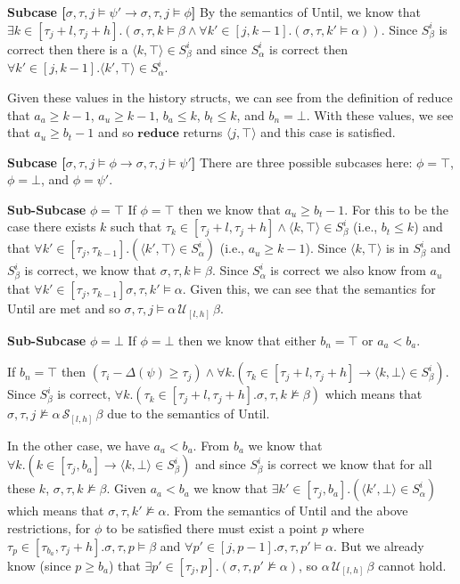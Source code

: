 \documentclass[10pt,a4paper]{article}
\newcommand{\rp}[2]{\ensuremath{\langle #1, #2 \rangle}}
\begin{document}
\textbf{Subcase [$\sigma, \tau, j \vDash \psi' \rightarrow \sigma, \tau, j \vDash \phi$]} 
By the semantics of Until, we know that $\exists k \in [\tau_j+l,\tau_j+h].(\sigma, \tau, k \vDash \beta \wedge \forall k' \in [j,k-1].(\sigma, \tau, k' \vDash \alpha))$. Since $S^i_{\beta}$ is correct then there is a $\rp{k}{\top} \in S^i_{\beta}$ and since $S^i_\alpha$ is correct then $\forall k' \in [j,k-1]. \rp{k'}{\top} \in S^i_\alpha$.

Given these values in the history structs, we can see from the definition of reduce that $a_a \geq k-1$, $a_u \geq k-1$, $b_a \leq k$, $b_t \leq k$, and $b_n = \bot$. With these values, we see that $a_u \geq b_t - 1$ and so $\mathbf{reduce}$ returns $\rp{j}{\top}$ and this case is satisfied.

\textbf{Subcase [$\sigma, \tau, j \vDash \phi \rightarrow \sigma, \tau, j \vDash \psi'$]}
There are three possible subcases here: $\phi = \top$, $\phi = \bot$, and $\phi = \psi'$.

\hspace{2em} \textbf{Sub-Subcase} $\phi = \top$
If $\phi = \top$ then we know that $a_u \geq b_t - 1$. For this to be the case there exists $k$ such that $\tau_k \in [\tau_j+l,\tau_j+h] \wedge \rp{k}{\top} \in S^i_\beta$ (i.e., $b_t \leq k$) and that $\forall k' \in [\tau_j,\tau_{k-1}].(\rp{k'}{\top} \in S^i_\alpha)$ (i.e., $a_u \geq k-1$). Since $\rp{k}{\top}$ is in $S^i_\beta$ and $S^i_\beta$ is correct, we know that $\sigma,\tau,k \vDash \beta$. Since $S^i_\alpha$ is correct we also know from $a_u$ that $\forall k' \in [\tau_j,\tau_{k-1}] \sigma, \tau, k' \vDash \alpha$. Given this, we can see that the semantics for Until are met and so $\sigma, \tau, j \vDash \alpha\, \mathcal{U}_{[l,h]}\, \beta$.

\hspace{2em} \textbf{Sub-Subcase} $\phi = \bot$
If $\phi = \bot$ then we know that either $b_n = \top$ or $a_a < b_a$. 

If $b_n = \top$ then $(\tau_i-\Delta(\psi) \geq \tau_j) \wedge \forall k.(\tau_k \in [\tau_j+l,\tau_j+h] \rightarrow \rp{k}{\bot} \in S^i_\beta)$. Since $S^i_\beta$ is correct, $\forall k.(\tau_k \in [\tau_j+l,\tau_j+h]. \sigma, \tau, k \nvDash \beta)$ which means that $\sigma, \tau, j \nvDash \alpha\, \mathcal{S}_{[l,h]}\, \beta$ due to the semantics of Until.

In the other case, we have $a_a < b_a$. From $b_a$ we know that $\forall k.(k \in [\tau_j,b_a] \rightarrow \rp{k}{\bot} \in S^i_\beta)$ and since $S^i_\beta$ is correct we know that for all these $k$, $\sigma,\tau,k \nvDash \beta$. 
Given $a_a < b_a$ we know that $\exists k' \in [\tau_j,b_a].(\rp{k'}{\bot} \in S^i_\alpha)$ which means that $\sigma, \tau, k' \nvDash \alpha$. 
From the semantics of Until and the above restrictions, for $\phi$ to be satisfied there must exist a point $p$ where $\tau_p \in [\tau_{b_a},\tau_j+h]. \sigma, \tau, p \vDash \beta$ and $\forall p' \in [j,p-1]. \sigma, \tau, p' \vDash \alpha$. 
But we already know (since $p \geq b_a$) that $\exists p' \in [\tau_j,p].(\sigma, \tau, p' \nvDash \alpha)$, so $\alpha\, \mathcal{U}_{[l,h]}\, \beta$ cannot hold.
\end{document}
